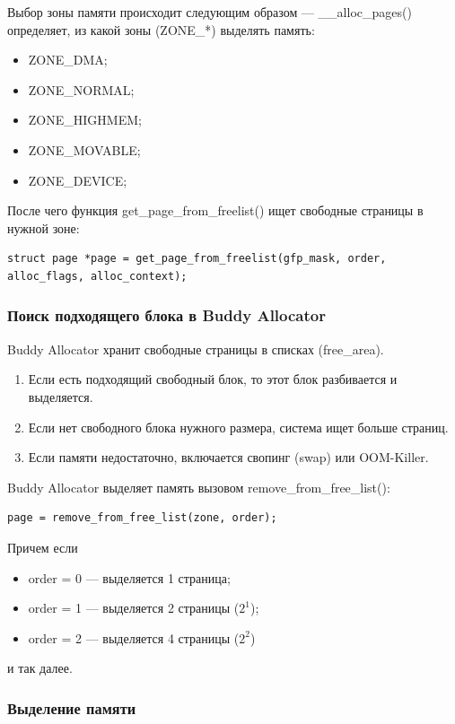 Выбор зоны памяти происходит следующим образом --- \_\_alloc\_pages() определяет, из какой зоны (ZONE\_*) выделять память:
\begin{itemize}
    \item ZONE\_DMA;
    \item ZONE\_NORMAL;
    \item ZONE\_HIGHMEM;
    \item ZONE\_MOVABLE;
    \item ZONE\_DEVICE;
\end{itemize}

После чего функция get\_page\_from\_freelist() ищет свободные страницы в нужной зоне:
\begin{lstlisting}
struct page *page = get_page_from_freelist(gfp_mask, order, alloc_flags, alloc_context);
\end{lstlisting}

\subsubsection*{Поиск подходящего блока в Buddy Allocator}

Buddy Allocator хранит свободные страницы в списках (free\_area).

\begin{enumerate}
    \item Если есть подходящий свободный блок, то этот блок разбивается и выделяется.
    \item Если нет свободного блока нужного размера, система ищет больше страниц.
    \item Если памяти недостаточно, включается свопинг (swap) или OOM-Killer.
\end{enumerate}

Buddy Allocator выделяет память вызовом remove\_from\_free\_list():
\begin{lstlisting}
page = remove_from_free_list(zone, order);
\end{lstlisting}

Причем если
\begin{itemize}
    \item order = 0 --- выделяется 1 страница;
    \item order = 1 --- выделяется 2 страницы ($2^1$);
    \item order = 2 --- выделяется 4 страницы ($2^2$)
\end{itemize}
и так далее.

\subsubsection*{Выделение памяти}

